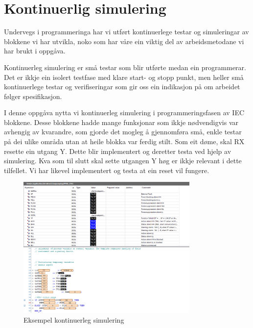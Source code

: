 \section{Kontinuerlig simulering}
\thispagestyle{fancy}

Undervegs i programmeringa har vi utført kontinuerlege testar og simuleringar av blokkene vi har utvikla, noko
som har våre ein viktig del av arbeidsmetodane vi har brukt i oppgåva. 

Kontinuerleg simulering er små testar som blir utførte medan ein programmerar.
Det er ikkje ein isolert testfase med klare start- og stopp punkt, men heller små kontinuerlege testar og verifiseringar som gir oss ein indikasjon
på om arbeidet følger spesifikasjon.

I denne oppgåva nytta vi kontinuerleg simulering i programmeringsfasen av \gls{IEC} blokkene.
Desse blokkene hadde mange funksjonar som ikkje nødvendigvis var avhengig av kvarandre,
som gjorde det mogleg å gjennomføra små, enkle testar på dei ulike områda utan at heile blokka var ferdig stilt.\newline
Som eit døme, skal \gls{RX} resette ein utgang \gls{Y}. Dette blir implementert og deretter testa ved hjelp av simulering.
Kva som til slutt skal sette utgangen \gls{Y} høg er ikkje relevant i dette tilfellet. Vi har likevel implementert 
og testa at ein reset vil fungere.


\begin{figure}[htbp]
    \centering
    \includegraphics[width=0.8\textwidth]{Bilder/kontinuerligSimulering.png}
    \caption{Eksempel kontinuerleg simulering}\label{fig:KontinuerlegSimulering}
\end{figure}


\newpage
